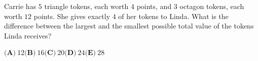 Carrie has $5$ triangle tokens, each worth $4$ points, and $3$ octagon tokens, each worth $12$ points. She gives exactly $4$ of her tokens to Linda. What is the difference between the largest and the smallest possible total value of the tokens Linda receives?

$\textbf{(A)}\ 12$\qquad$\textbf{(B)}\ 16$\qquad$\textbf{(C)}\ 20$\qquad$\textbf{(D)}\ 24$\qquad$\textbf{(E)}\ 28$
